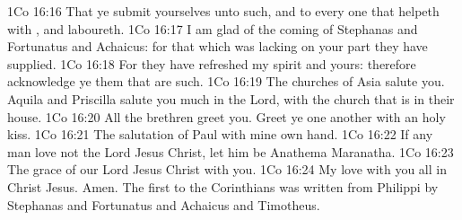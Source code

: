 \vs 1Co 16:16 That ye submit yourselves unto such, and to every one that helpeth with , and laboureth.
\vs 1Co 16:17 I am glad of the coming of Stephanas and Fortunatus and Achaicus: for that which was lacking on your part they have supplied.
\vs 1Co 16:18 For they have refreshed my spirit and yours: therefore acknowledge ye them that are such.
\vs 1Co 16:19 The churches of Asia salute you. Aquila and Priscilla salute you much in the Lord, with the church that is in their house.
\vs 1Co 16:20 All the brethren greet you. Greet ye one another with an holy kiss.
\vs 1Co 16:21 The salutation of  Paul with mine own hand.
\vs 1Co 16:22 If any man love not the Lord Jesus Christ, let him be Anathema Maranatha.
\vs 1Co 16:23 The grace of our Lord Jesus Christ  with you.
\vs 1Co 16:24 My love  with you all in Christ Jesus. Amen. The first  to the Corinthians was written from Philippi by Stephanas and Fortunatus and Achaicus and Timotheus.
